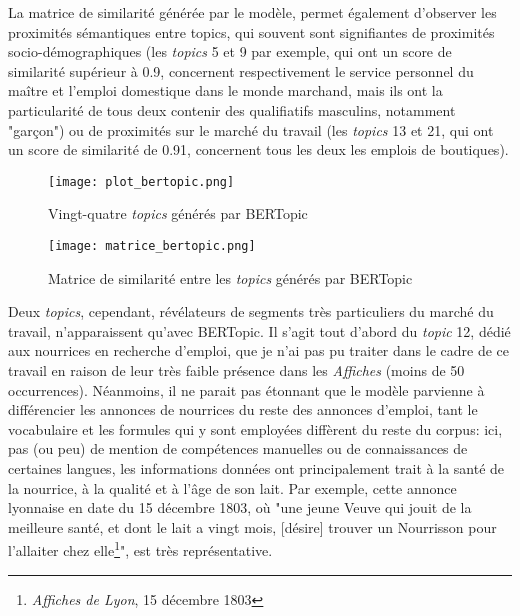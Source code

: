 La matrice de similarité générée par le modèle, permet également d'observer les proximités sémantiques entre topics, qui souvent sont signifiantes de proximités socio-démographiques (les \textit{topics} 5 et 9 par exemple, qui ont un score de similarité supérieur à 0.9, concernent respectivement le service personnel du maître et l'emploi domestique dans le monde marchand, mais ils ont la particularité de tous deux contenir des qualifiatifs masculins, notamment "garçon") ou de proximités sur le marché du travail (les \textit{topics} 13 et 21, qui ont un score de similarité de 0.91, concernent tous les deux les emplois de boutiques). 

\begin{figure}[h!t]
	\centering
	\texttt{[image: plot\_bertopic.png]}
	\caption{Vingt-quatre \textit{topics} générés par BERTopic}
\end{figure}

\begin{figure}[h!t]
	\centering
	\texttt{[image: matrice\_bertopic.png]}
	\caption{Matrice de similarité entre les \textit{topics} générés par BERTopic}
\end{figure}



Deux \textit{topics}, cependant, révélateurs de segments très particuliers du marché du travail, n'apparaissent qu'avec BERTopic. Il s'agit tout d'abord du \textit{topic} 12, dédié aux nourrices en recherche d'emploi, que je n'ai pas pu traiter dans le cadre de ce travail en raison de leur très faible présence dans les \textit{Affiches} (moins de 50 occurrences). Néanmoins, il ne parait pas étonnant que le modèle parvienne à différencier les annonces de nourrices du reste des annonces d'emploi, tant le vocabulaire et les formules qui y sont employées diffèrent du reste du corpus: ici, pas (ou peu) de mention de compétences manuelles ou de connaissances de certaines langues, les informations données ont principalement trait à la santé de la nourrice, à la qualité et à l'âge de son lait. Par exemple, cette annonce lyonnaise en date du 15 décembre 1803, où "une jeune Veuve qui jouit de la meilleure santé, et dont le lait a vingt mois, [désire] trouver un Nourrisson pour l'allaiter chez elle\footnote{\textit{Affiches de Lyon}, 15 décembre 1803}", est très représentative.

